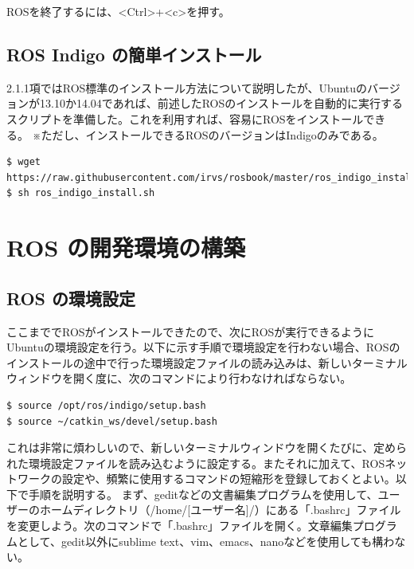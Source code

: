 ROSを終了するには、<Ctrl>+<c>を押す。

\subsection{ROS Indigo の簡単インストール}

2.1.1項ではROS標準のインストール方法について説明したが、Ubuntuのバージョンが13.10か14.04であれば、前述したROSのインストールを自動的に実行するスクリプトを準備した。これを利用すれば、容易にROSをインストールできる。
※ただし、インストールできるROSのバージョンはIndigoのみである。

\begin{lstlisting}[language=ROS]
$ wget https://raw.githubusercontent.com/irvs/rosbook/master/ros_indigo_install.sh
$ sh ros_indigo_install.sh
\end{lstlisting}

\section{ROS の開発環境の構築}

\subsection{ROS の環境設定}

ここまででROSがインストールできたので、次にROSが実行できるようにUbuntuの環境設定を行う。以下に示す手順で環境設定を行わない場合、ROSのインストールの途中で行った環境設定ファイルの読み込みは、新しいターミナルウィンドウを開く度に、次のコマンドにより行わなければならない。

\begin{lstlisting}[language=ROS]
$ source /opt/ros/indigo/setup.bash
$ source ~/catkin_ws/devel/setup.bash
\end{lstlisting}

これは非常に煩わしいので、新しいターミナルウィンドウを開くたびに、定められた環境設定ファイルを読み込むように設定する。またそれに加えて、ROSネットワークの設定や、頻繁に使用するコマンドの短縮形を登録しておくとよい。以下で手順を説明する。
まず、geditなどの文書編集プログラムを使用して、ユーザーのホームディレクトリ（/home/[ユーザー名]/）にある「.bashrc」ファイルを変更しよう。次のコマンドで「.bashrc」ファイルを開く。文章編集プログラムとして、gedit以外にsublime text、vim、emacs、nanoなどを使用しても構わない。

